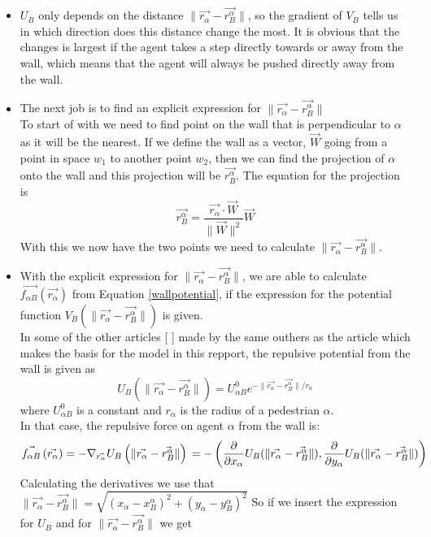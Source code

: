 \begin{itemize}
\item  $U_B$ only depends on the distance $ \| \vec{r_{\alpha}} - \vec{r_{B}^{\alpha}} \|$, so the gradient of $V_B$ tells us in which direction does this distance change the most. It is obvious that the changes is largest if the agent takes a step directly towards or away from the wall, which means that the agent will always be pushed directly away from the wall.

\item The next job is to find an explicit expression for $ \| \vec{r_{\alpha}} - \vec{r_{B}^{\alpha}} \|$\\
To start of with we need to find point on the wall that is perpendicular to $\alpha$ as it will be the nearest.  
If we define the wall as a vector, $\vec{W}$ going from a point in space $w_1$ to another point $w_2$, then we can find the projection of $\alpha$ onto the wall and this projection will be $\vec{r_{B}^{\alpha}}$.
The equation for the projection is
\begin{equation}\label{wall}
\vec{r_{B}^{\alpha}}=\frac{\vec{r_{\alpha}}\cdot \vec{W}}{\| \vec{W} \|^2}\vec{W}
\end{equation}
With this we now have the two points we need to calculate $ \| \vec{r_{\alpha}} - \vec{r_{B}^{\alpha}} \|$.


\item With the explicit expression for $ \| \vec{r_{\alpha}} - \vec{r_{B}^{\alpha}} \| $, we are able to calculate $ \vec{f_{\alpha B}} \left( \vec{r_{\alpha}} \right) $ from Equation \ref{wallpotential}, if the expression for the potential function $ V_{B}
    \left( \| \vec{r_{\alpha}} - \vec{r_{B}^{\alpha}} \| \right) $ is given.\\
In some of the other articles [ ] made by the same outhers as the article which makes the basis for the model in this repport, the repulsive potential from the wall is given as
\begin{equation}
U_{B} \left( \| \vec{r_{\alpha}} - \vec{r_{B}^{\alpha}} \| \right) =
U^0_{\alpha B} e^{- \| \vec{r_{\alpha}} - \vec{r_{B}^{\alpha}} \| / r_{\alpha} }
\end{equation}
where $U^0_{\alpha B}$ is a constant and $r_{\alpha}$ is the radius of a pedestrian $\alpha$. \\

In that case, the repulsive force on agent $ \alpha $ from the wall is:
\begin{equation}
    \vec{f_{\alpha B}} \left( \vec{r_{\alpha}} \right) =
    - \nabla_{\vec{r_{\alpha}}} U_{B}
    \left( \| \vec{r_{\alpha}} - \vec{r_{B}^{\alpha}} \| \right)\\
=-\left( \frac{\partial}{\partial x_{\alpha}}U_{B}( \| \vec{r_{\alpha}} - \vec{r_{B}^{\alpha}} \|), \frac{\partial}{\partial y_{\alpha}}U_{B}( \| \vec{r_{\alpha}} - \vec{r_{B}^{\alpha}} \|)\right) \\
\end{equation}
Calculating the derivatives we use that $\| \vec{r_{\alpha}} - \vec{r_{B}^{\alpha}} \|= \sqrt{(x_{\alpha}-x^{\alpha}_{B})^2+(y_{\alpha}-y^{\alpha}_B)^2}$
So if we insert the expression for $U_{B}$ and for $\| \vec{r_{\alpha}} - \vec{r_{B}^{\alpha}} \|$ we get


\end{itemize}
